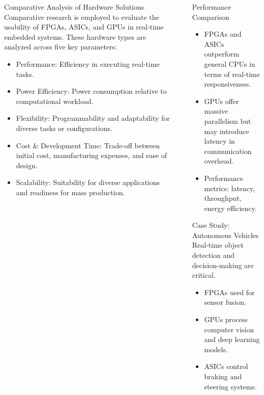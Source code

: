 \documentclass[final]{beamer}
\newlength{\sepwidth}
\newlength{\colwidth}
\newcommand{\separatorcolumn}{\begin{column}{\sepwidth}\end{column}}
\begin{document}
\begin{frame}[t]
\begin{columns}[t]
\begin{column}{\colwidth}
   \begin{block}{Comparative Analysis of Hardware Solutions}
   Comparative research is employed to evaluate the usability of FPGAs, ASICs, and GPUs in real-time embedded systems. These hardware types are analyzed across five key parameters:
   \begin{itemize}
       \item Performance: Efficiency in executing real-time tasks.
       \item Power Efficiency: Power consumption relative to computational workload.
       \item Flexibility: Programmability and adaptability for diverse tasks or configurations.
       \item Cost & Development Time: Trade-off between initial cost, manufacturing expenses, and ease of design.
       \item Scalability: Suitability for diverse applications and readiness for mass production.
   \end{itemize}
  \end{block}

 

\end{column}

\separatorcolumn

\begin{column}{\colwidth}

  \begin{block}{Performance Comparison}
    \begin{itemize}
      \item FPGAs and ASICs outperform general CPUs in terms of real-time responsiveness.
      \item GPUs offer massive parallelism but may introduce latency in communication overhead.
      \item Performance metrics: latency, throughput, energy efficiency.
    \end{itemize}
  \end{block}

  \begin{block}{Case Study: Autonomous Vehicles}
    Real-time object detection and decision-making are critical.
    \begin{itemize}
      \item FPGAs used for sensor fusion.
      \item GPUs process computer vision and deep learning models.
      \item ASICs control braking and steering systems.
    \end{itemize}


\end{block}
\end{column}
\end{columns}
\end{frame}
\end{document}

